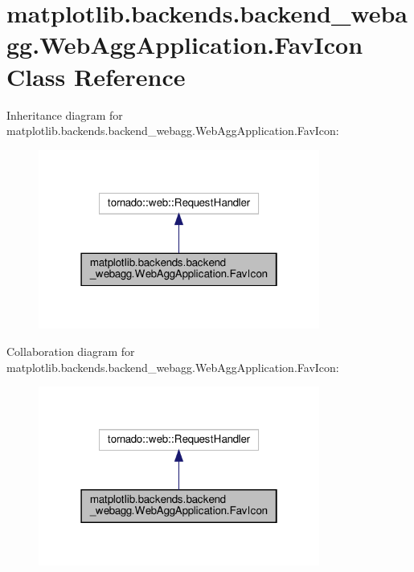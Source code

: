 \hypertarget{classmatplotlib_1_1backends_1_1backend__webagg_1_1WebAggApplication_1_1FavIcon}{}\section{matplotlib.\+backends.\+backend\+\_\+webagg.\+Web\+Agg\+Application.\+Fav\+Icon Class Reference}
\label{classmatplotlib_1_1backends_1_1backend__webagg_1_1WebAggApplication_1_1FavIcon}


Inheritance diagram for matplotlib.\+backends.\+backend\+\_\+webagg.\+Web\+Agg\+Application.\+Fav\+Icon\+:
\nopagebreak
\begin{figure}[H]
\begin{center}
\leavevmode
\includegraphics[width=262pt]{classmatplotlib_1_1backends_1_1backend__webagg_1_1WebAggApplication_1_1FavIcon__inherit__graph}
\end{center}
\end{figure}


Collaboration diagram for matplotlib.\+backends.\+backend\+\_\+webagg.\+Web\+Agg\+Application.\+Fav\+Icon\+:
\nopagebreak
\begin{figure}[H]
\begin{center}
\leavevmode
\includegraphics[width=262pt]{classmatplotlib_1_1backends_1_1backend__webagg_1_1WebAggApplication_1_1FavIcon__coll__graph}
\end{center}
\end{figure}
